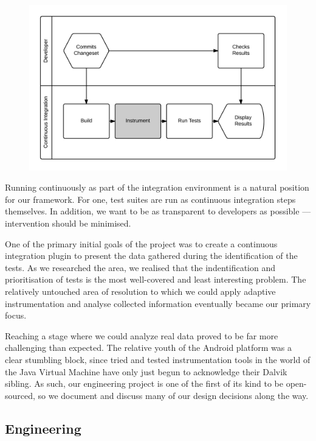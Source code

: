 \begin{figure}[h]

\includegraphics[width=\linewidth]{Images/developer_workflow}

\caption{}
\label{fig:developer_workflow}
\end{figure}

Running continuously as part of the integration environment is a natural
position for our framework. For one, test suites are run as continuous
integration steps themselves. In addition, we want to be as transparent to
developers as possible --- intervention should be minimised.

One of the primary initial goals of the project was to create a continuous
integration plugin to present the data gathered during the identification of the
\flaky tests. As we researched the area, we realised that the indentification
and prioritisation of \flaky tests is the most well-covered and least
interesting problem. The relatively untouched area of resolution to which we
could apply adaptive instrumentation and analyse collected information
eventually became our primary focus.

Reaching a stage where we could analyze real data proved to be far more
challenging than expected. The relative youth of the Android platform was a
clear stumbling block, since tried and tested instrumentation tools in the world
of the Java Virtual Machine have only just begun to acknowledge their Dalvik
sibling. As such, our engineering project is one of the first of its kind to be
open-sourced, so we document and discuss many of our design decisions along the
way.


\subsection{Engineering}

